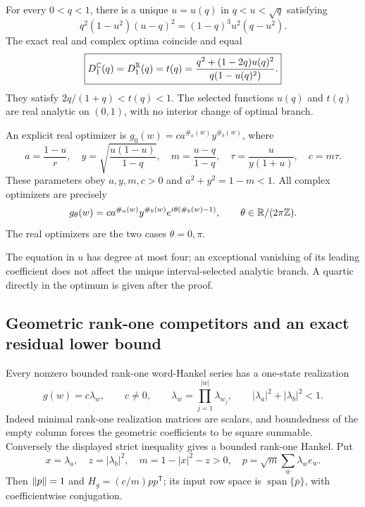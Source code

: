 \begin{theorem}
\label{I:F:thm:F1-exact}
For every $0<q<1$, there is a unique $u=u(q)$ in
$q<u<\sqrt q$ satisfying
\begin{equation}
 q^2(1-u^2)(u-q)^2=(1-q)^3u^2(q-u^2).
 \label{I:F:eq:F1-u-quartic}
\end{equation}
The exact real and complex optima coincide and equal
\begin{equation}
 \boxed{\displaystyle
 D_1^{\mathbb C}(q)=D_1^{\mathbb R}(q)=t(q)
 =\frac{q^2+(1-2q)u(q)^2}{q(1-u(q)^2)}.}
 \label{I:F:eq:F1-value}
\end{equation}
They satisfy $2q/(1+q)<t(q)<1$. The selected functions $u(q)$ and
$t(q)$ are real analytic on $(0,1)$, with no interior change of optimal
branch.

An explicit real optimizer is $g_0(w)=c a^{\#_a(w)}y^{\#_b(w)}$, where
\begin{equation}
 a=\frac{1-u}{r},\quad
 y=\sqrt{\frac{u(1-u)}{1-q}},\quad
 m=\frac{u-q}{1-q},\quad
 \tau=\frac{u}{y(1+u)},\quad c=m\tau.
 \label{I:F:eq:F1-optimizer-parameters}
\end{equation}
These parameters obey $a,y,m,c>0$ and $a^2+y^2=1-m<1$.
All complex optimizers are precisely
\begin{equation}
 g_\theta(w)=c a^{\#_a(w)}y^{\#_b(w)}
             e^{i\theta(\#_b(w)-1)},\qquad
 \theta\in\mathbb R/(2\pi\mathbb Z).
 \label{I:F:eq:F1-all-optimizers}
\end{equation}
The real optimizers are the two cases $\theta=0,\pi$.
\end{theorem}

The equation in $u$ has degree at most four; an exceptional vanishing of
its leading coefficient does not affect the unique interval-selected
analytic branch. A quartic directly in the optimum is given after the
proof.

\subsection{Geometric rank-one competitors and an exact residual lower bound}

Every nonzero bounded rank-one word-Hankel series has a one-state
realization
\[
 g(w)=c\lambda_w,\qquad c\ne0,\qquad
 \lambda_w=\prod_{j=1}^{|w|}\lambda_{w_j},\qquad
 |\lambda_a|^2+|\lambda_b|^2<1.
\]
Indeed minimal rank-one realization matrices are scalars, and boundedness
of the empty column forces the geometric coefficients to be square
summable. Conversely the displayed strict inequality gives a bounded
rank-one Hankel. Put
\[
 x=\lambda_a,\quad z=|\lambda_b|^2,\quad
 m=1-|x|^2-z>0,\quad
 p=\sqrt m\sum_w\lambda_w e_w.
\]
Then $\left\lVert p\right\rVert=1$ and $H_g=(c/m)pp^{\mathsf T}$; its input row space is
$\operatorname{span}\{\overline p\}$, with coefficientwise conjugation.

